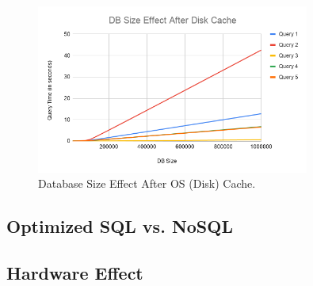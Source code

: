 \begin{figure}[H]
    \centering
    \includegraphics[width=0.8\textwidth]{images/db-size-after-cache .png}
    \caption{Database Size Effect After OS (Disk) Cache.}
    \label{fig:db-size-2}
\end{figure}

\subsection{Optimized SQL vs. NoSQL}

\subsection{Hardware Effect}
